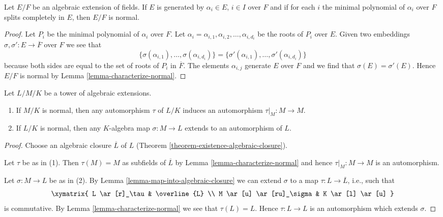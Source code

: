 \begin{lemma}
\label{lemma-normally-generated}
Let $E/F$ be an algebraic extension of fields.
If $E$ is generated by $\alpha_i \in E$, $i \in I$
over $F$ and if for each $i$ the minimal polynomial
of $\alpha_i$ over $F$ splits completely in $E$, then
$E/F$ is normal.
\end{lemma}

\begin{proof}
Let $P_i$ be the minimal polynomial of $\alpha_i$ over $F$.
Let $\alpha_i = \alpha_{i, 1}, \alpha_{i, 2}, \ldots, \alpha_{i, d_i}$
be the roots of $P_i$ over $E$. Given two embeddings
$\sigma, \sigma' : E \to \overline{F}$ over $F$ we see that
$$
\{\sigma(\alpha_{i, 1}), \ldots, \sigma(\alpha_{i, d_i})\} =
\{\sigma'(\alpha_{i, 1}), \ldots, \sigma'(\alpha_{i, d_i})\}
$$
because both sides are equal to the set of roots of $P_i$
in $\overline{F}$. The elements $\alpha_{i, j}$
generate $E$ over $F$ and we find that $\sigma(E) = \sigma'(E)$.
Hence $E/F$ is normal by Lemma \ref{lemma-characterize-normal}.
\end{proof}

\begin{lemma}
\label{lemma-lift-maps}
Let $L/M/K$ be a tower of algebraic extensions.
\begin{enumerate}
\item If $M/K$ is normal, then any automorphism $\tau$ of $L/K$
induces an automorphism $\tau|_M : M \to M$.
\item If $L/K$ is normal, then any $K$-algebra map $\sigma : M \to L$
extends to an automorphism of $L$.
\end{enumerate}
\end{lemma}

\begin{proof}
Choose an algebraic closure $\overline{L}$ of $L$
(Theorem \ref{theorem-existence-algebraic-closure}).

\medskip\noindent
Let $\tau$ be as in (1). Then $\tau(M) = M$ as subfields of $\overline{L}$
by Lemma \ref{lemma-characterize-normal} and hence
$\tau|_M : M \to M$ is an automorphism.

\medskip\noindent
Let $\sigma : M \to L$ be as in (2).
By Lemma \ref{lemma-map-into-algebraic-closure}
we can extend $\sigma$ to a map
$\tau : L \to \overline{L}$, i.e., such that
$$
\xymatrix{
L \ar[r]_\tau & \overline{L} \\
M \ar[u] \ar[ru]_\sigma & K \ar[l] \ar[u]
}
$$
is commutative. By Lemma \ref{lemma-characterize-normal} we see that
$\tau(L) = L$. Hence $\tau : L \to L$ is an automorphism which
extends $\sigma$.
\end{proof}

